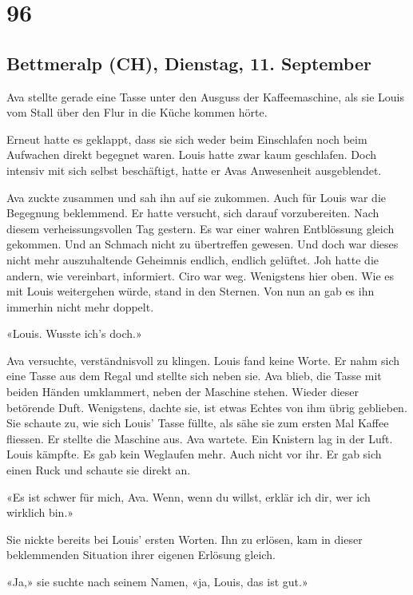 \chapter{96}

\section{Bettmeralp (CH), Dienstag, 11.
September}



Ava stellte gerade eine Tasse unter den Ausguss der Kaffeemaschine, als
sie Louis vom Stall über den Flur in die Küche kommen hörte.

Erneut hatte es geklappt, dass sie sich weder beim Einschlafen noch beim
Aufwachen direkt begegnet waren. Louis hatte zwar kaum geschlafen. Doch
intensiv mit sich selbst beschäftigt, hatte er Avas Anwesenheit
ausgeblendet.

Ava zuckte zusammen und sah ihn auf sie zukommen. Auch für Louis war die
Begegnung beklemmend. Er hatte versucht, sich darauf vorzubereiten. Nach
diesem verheissungsvollen Tag gestern. Es war einer wahren Entblössung
gleich gekommen. Und an Schmach nicht zu übertreffen gewesen. Und doch
war dieses nicht mehr auszuhaltende Geheimnis endlich, endlich gelüftet.
Joh hatte die andern, wie vereinbart, informiert. Ciro war weg.
Wenigstens hier oben. Wie es mit Louis weitergehen würde, stand in den
Sternen. Von nun an gab es ihn immerhin nicht mehr doppelt.

«Louis. Wusste ich’s doch.»

Ava versuchte, verständnisvoll zu klingen.
Louis fand keine Worte. Er nahm sich eine Tasse aus dem Regal und
stellte sich neben sie. 
Ava blieb, die Tasse mit beiden Händen umklammert, neben der Maschine
stehen. Wieder dieser betörende Duft. Wenigstens, dachte sie, 
ist etwas Echtes von ihm übrig geblieben.
Sie schaute zu, wie sich Louis’ Tasse füllte, als sähe sie zum
ersten Mal Kaffee fliessen.
Er stellte die Maschine aus. Ava wartete. Ein Knistern lag in der
Luft. Louis kämpfte. Es gab kein Weglaufen mehr. Auch nicht vor ihr.
Er gab sich einen Ruck und schaute sie direkt an.

«Es ist schwer für mich, Ava. Wenn, wenn du willst, erklär ich dir, wer
ich wirklich bin.»

Sie nickte bereits bei Louis’ ersten Worten. Ihn zu erlösen, kam in
dieser beklemmenden Situation ihrer eigenen Erlösung gleich.

«Ja,» sie suchte nach seinem Namen, «ja, Louis, das ist gut.»

